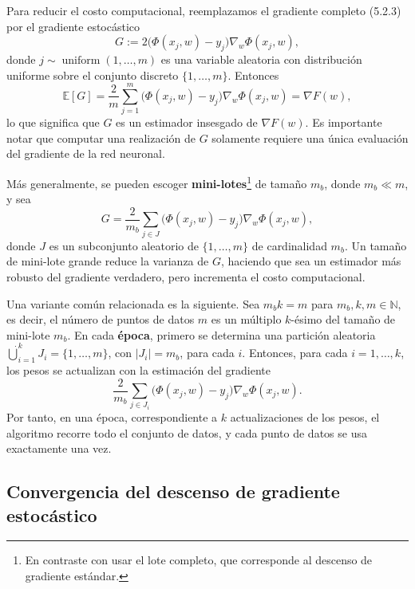 \documentclass[11pt]{report}
\theoremstyle{definition}
\theoremstyle{plain}
\numberwithin{equation}{section}
\begin{document}
Para reducir el costo computacional, reemplazamos el gradiente completo (5.2.3) por el gradiente estocástico
\begin{equation*}
    G
    :=
    2\bigl(\Phi(x_j,w)-y_j\bigr)
    \nabla_w\Phi(x_j,w),
\end{equation*}
donde \(j\sim \operatorname{uniform}(1,\ldots,m)\) es una variable aleatoria con distribución uniforme sobre el conjunto discreto \(\{1,\ldots,m\}\). Entonces
\begin{equation*}
    \mathbb{E}[G]
    =
    \frac{2}{m}
    \sum_{j=1}^{m}
    \bigl(\Phi(x_j,w)-y_j\bigr)
    \nabla_w\Phi(x_j,w)
    =
    \nabla F(w),
\end{equation*}
lo que significa que \(G\) es un estimador insesgado de \(\nabla F(w)\). Es importante notar que computar una realización de \(G\) solamente requiere una única evaluación del gradiente de la red neuronal.

Más generalmente, se pueden escoger \textbf{mini-lotes}\footnote{En contraste con usar el lote completo, que corresponde al descenso de gradiente estándar.} de tamaño \(m_b\), donde \(m_b\ll m\), y sea
\begin{equation*}
    G
    =
    \frac{2}{m_b}
    \sum_{j\in J}
    \bigl(\Phi(x_j,w)-y_j\bigr)
    \nabla_w\Phi(x_j,w),
\end{equation*}
donde \(J\) es un subconjunto aleatorio de \(\{1,\ldots,m\}\) de cardinalidad \(m_b\). Un tamaño de mini-lote grande reduce la varianza de \(G\), haciendo que sea un estimador más robusto del gradiente verdadero, pero incrementa el costo computacional.

Una variante común relacionada es la siguiente. Sea \(m_bk=m\) para \(m_b,k,m\in\mathbb{N}\), es decir, el número de puntos de datos \(m\) es un múltiplo \(k\)-ésimo del tamaño de mini-lote \(m_b\). En cada \textbf{época}, primero se determina una partición aleatoria \(\dot{\bigcup}_{i=1}^{k}J_i=\{1,\ldots,m\}\), con \(|J_i|=m_b\), para cada \(i\). Entonces, para cada \(i=1,\ldots,k\), los pesos se actualizan con la estimación del gradiente
\begin{equation*}
    \frac{2}{m_b}
    \sum_{j\in J_i}
    \bigl(\Phi(x_j,w)-y_j\bigr)
    \nabla_w\Phi(x_j,w).
\end{equation*}
Por tanto, en una época, correspondiente a \(k\) actualizaciones de los pesos, el algoritmo recorre todo el conjunto de datos, y cada punto de datos se usa exactamente una vez.

\subsection{Convergencia del descenso de gradiente estocástico}
\end{document}
